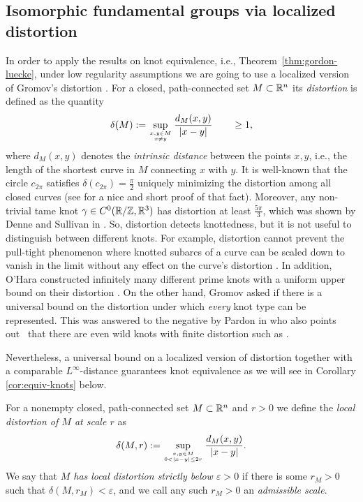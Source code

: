 \subsection{Isomorphic fundamental groups via localized distortion}
In order to apply the results on knot equivalence, i.e., Theorem~\ref{thm:gordon-luecke},
under low regularity assumptions
we are going to use a localized version of Gromov's distortion \cite{gromov_1978}. 
For a closed, path-connected set $M\subset\mathbb{R}^n$ its \emph{distortion} is defined as
the quantity
\begin{equation}\label{eq:distortion}
\delta(M):=\sup_{x,y\in M\atop x\not= y}\frac{d_M(x,y)}{|x-y|}
\qquad\ge 1,
\end{equation}
where $d_M(x,y)$ denotes the  
\emph{intrinsic distance} between the points $x,y$, i.e.,
the length of the shortest curve  in $M$ connecting $x$ with $y$. It is well-known that
the circle $c_{2\pi}$ satisfies $\delta(c_{2\pi})=\frac{\pi}2$ uniquely minimizing 
the distortion among all closed curves (see \cite[Proposition 2.1]{kusner-sullivan_1997} 
for a nice and short proof of that fact).  
Moreover, any non-trivial tame
knot $\gamma\in C^0(\mathbb{R}/\mathbb{Z},\mathbb{R}^3)$ has distortion at least
$\frac{5\pi}3$, which was shown by Denne and Sullivan in \cite{denne-sullivan_2009}.
So, distortion detects knottedness, but it is not useful to distinguish between different
knots. For example, distortion cannot prevent the pull-tight phenomenon 
where knotted subarcs of a curve 
can be scaled down to vanish in the limit without any effect
on the curve's distortion \cite{mullikin_2007}. In addition, O'Hara constructed infinitely many
different prime knots with a uniform upper bound on their distortion 
\cite[Theorem~3.5]{ohara_1992a}.
On the other hand, Gromov asked if there is a universal bound on the distortion 
under which \emph{every}
knot type can be represented.
This was answered to the negative by Pardon in
\cite[Theorems 1.1 \& 1.2]{pardon_2011}
who also points out~\cite[p.~638]{pardon_2011} that there are 
even wild knots with finite distortion such as \cite[Figure~5]{crowell-fox_1977}.

Nevertheless, a universal bound on a
localized version of distortion
together with a comparable $L^\infty$-distance guarantees knot equivalence as
we will see in Corollary \ref{cor:equiv-knots} below.
\begin{definition}\label{def:local-distortion}
For a nonempty closed, path-connected set $M\subset\mathbb{R}^n$ and $r>0$ we define
the \emph{local distortion of $M$ at scale $r$} as
\begin{equation}\label{eq:local-distortion}
\delta(M,r):=\sup_{x,y\in M\atop 0<|x-y|\le 2r}\frac{d_M(x,y)}{|x-y|}.
\end{equation}
We say that \emph{$M$ has local distortion strictly below $\varepsilon>0$}
if there is some $r_M>0$ such that $\delta(M,r_M)<\varepsilon$,
and we call any such $r_M>0$ an \emph{admissible scale}.
\end{definition}

